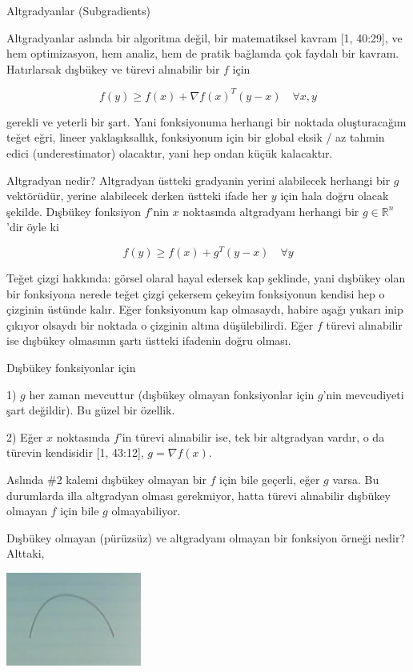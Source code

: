 \documentclass[12pt,fleqn]{article}\usepackage{../../common}
\begin{document}
Altgradyanlar (Subgradients) 

Altgradyanlar aslında bir algoritma değil, bir matematiksel kavram [1,
40:29], ve hem optimizasyon, hem analiz, hem de pratik bağlamda çok faydalı
bir kavram.  Hatırlarsak dışbükey ve türevi alınabilir bir $f$ için

$$
f(y) \ge f(x) + \nabla f(x)^T (y-x)  \quad \forall x,y
$$

gerekli ve yeterli bir şart. Yani fonksiyonuma herhangi bir noktada
oluşturacağım teğet eğri, lineer yaklaşıksallık, fonksiyonum için bir
global eksik / az tahmin edici (underestimator) olacaktır, yani hep ondan
küçük kalacaktır.

Altgradyan nedir? Altgradyan üstteki gradyanin yerini alabilecek herhangi
bir $g$ vektörüdür, yerine alabilecek derken üstteki ifade her $y$ için
hala doğru olacak şekilde. Dışbükey fonksiyon $f$'nin $x$ noktasında
altgradyanı herhangi bir $g \in \mathbb{R}^n$'dir öyle ki

$$
f(y) \ge f(x) + g^T (y-x) \quad \forall y
$$

Teğet çizgi hakkında: görsel olaral hayal edersek kap şeklinde, yani
dışbükey olan bir fonksiyona nerede teğet çizgi çekersem çekeyim
fonksiyonun kendisi hep o çizginin üstünde kalır. Eğer fonksiyonum kap
olmasaydı, habire aşağı yukarı inip çıkıyor olsaydı bir noktada o çizginin
altına düşülebilirdi. Eğer $f$ türevi alınabilir ise dışbükey olmasının
şartı üstteki ifadenin doğru olması.

Dışbükey fonksiyonlar için 

1) $g$ her zaman mevcuttur (dışbükey olmayan fonksiyonlar için $g$'nin
mevcudiyeti şart değildir). Bu güzel bir özellik. 

2) Eğer $x$ noktasında $f$'in türevi alınabilir ise, tek bir altgradyan
vardır, o da türevin kendisidir [1, 43:12], $g = \nabla f(x)$.

Aslında \#2 kalemi dışbükey olmayan bir $f$ için bile geçerli, eğer $g$
varsa. Bu durumlarda illa altgradyan olması gerekmiyor, hatta türevi
alınabilir dışbükey olmayan $f$ için bile $g$ olmayabiliyor. 

Dışbükey olmayan (pürüzsüz) ve altgradyanı olmayan bir fonksiyon örneği
nedir? Alttaki,

\includegraphics[width=12em]{func_42_subgrad_01.png}
\end{document}

